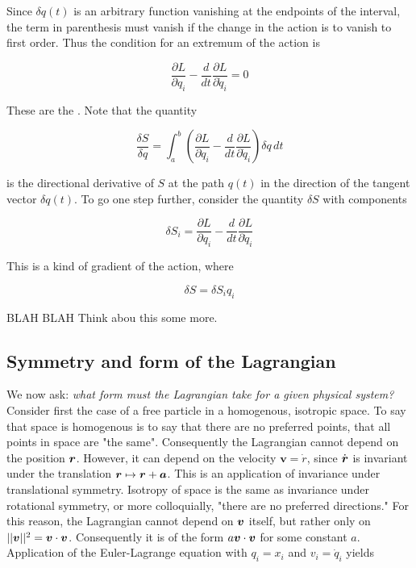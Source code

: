 Since $\delta q(t)$ is an arbitrary function vanishing at the endpoints of the interval, the term in parenthesis must vanish if the change in the action is to vanish to first order.  Thus the condition for an extremum of the action is

\begin{equation}
\label{eulerlagrangeequation}
\frac{\partial L}{\partial q_i}
 - \frac{d}{dt} \frac{\partial L}{\partial \dot q_i} = 0
\end{equation}

These are the .  Note that the quantity

\begin{equation}
\label{actionderivative|}
\frac{\delta S}{\delta q} =  \int_a^b\left(\frac{\partial L}{\partial q_i}
 - \frac{d}{dt} \frac{\partial L}{\partial \dot q_i}\right)\delta q\, dt
\end{equation}

is the directional derivative of $S$ at the path $q(t)$ in the direction of the tangent vector $\delta q(t)$.  To go one step further, consider the quantity $\delta S$ with components

\begin{equation}
\label{actiondifferential}
\delta S_i =  \frac{\partial L}{\partial q_i}
 - \frac{d}{dt} \frac{\partial L}{\partial \dot q_i}
\end{equation}

This is a kind of gradient of the action, where

\begin{equation}
\delta S = \delta S_i q_i
\end{equation}

BLAH BLAH Think abou this some more.





\subsection{Symmetry and form of the Lagrangian}

We now ask: \emph{what form must the Lagrangian take for a given physical system?}  Consider first the case of a free particle in a homogenous, isotropic space.  To say that space is homogenous is to say that there are no preferred points, that all points in space are "the same".  Consequently the Lagrangian cannot depend on the position $\boldsymbol{r}$.  However, it can depend on the velocity $\boldsymbol{v} = \dot r $, since $\dot {\boldsymbol{r}}$ is invariant under the translation $\boldsymbol{r} \mapsto \boldsymbol{r} + \boldsymbol{a}$.  This is an application of invariance under translational symmetry.  Isotropy of space is the same as invariance under rotational symmetry, or more colloquially, "there are no preferred directions."  For this reason, the Lagrangian cannot depend on $\boldsymbol{v}$ itself, but rather only on $||\boldsymbol{v}||^2 = \boldsymbol{v}\cdot\boldsymbol{v}$.  Consequently it is of the form $a\boldsymbol{v}\cdot\boldsymbol{v}$ for some constant $a$. Application of the Euler-Lagrange equation with $q_i = x_i$ and $v_i  = \dot q_i$ yields

